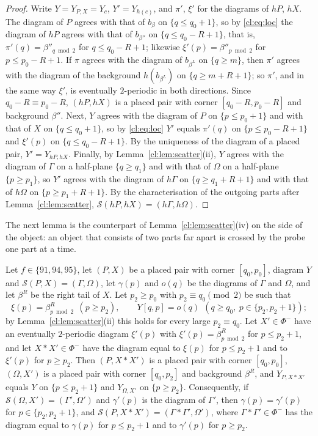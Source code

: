 \begin{proof}
Write $Y=Y_{P,X}=Y_c$, $Y'=Y_{h(c)}$, and $\pi'$, $\xi'$ for the diagrams of $hP$, $hX$. The diagram of $P$ agrees with that of $b_\beta$ on $\{q\le q_0+1\}$, so by \eqref{cl:eq:loc} the diagram of $hP$ agrees with that of $b_{\beta''}$ on $\{q\le q_0-R+1\}$, that is, $\pi'(q)=\beta''_{q\bmod2}$ for $q\le q_0-R+1$; likewise $\xi'(p)=\beta''_{p\bmod2}$ for $p\le p_0-R+1$. If $\pi$ agrees with the diagram of $b_{\beta^L}$ on $\{q\ge m\}$, then $\pi'$ agrees with the diagram of the background $h(b_{\beta^L})$ on $\{q\ge m+R+1\}$; so $\pi'$, and in the same way $\xi'$, is eventually $2$-periodic in both directions. Since $q_0-R\equiv p_0-R$, $(hP,hX)$ is a placed pair with corner $[q_0-R,p_0-R]$ and background $\beta''$. Next, $Y$ agrees with the diagram of $P$ on $\{p\le p_0+1\}$ and with that of $X$ on $\{q\le q_0+1\}$, so by \eqref{cl:eq:loc} $Y'$ equals $\pi'(q)$ on $\{p\le p_0-R+1\}$ and $\xi'(p)$ on $\{q\le q_0-R+1\}$. By the uniqueness of the diagram of a placed pair, $Y'=Y_{hP,hX}$. Finally, by Lemma~\ref{cl:lem:scatter}(ii), $Y$ agrees with the diagram of $\Gamma$ on a half-plane $\{q\ge q_1\}$ and with that of $\Omega$ on a half-plane $\{p\ge p_1\}$, so $Y'$ agrees with the diagram of $h\Gamma$ on $\{q\ge q_1+R+1\}$ and with that of $h\Omega$ on $\{p\ge p_1+R+1\}$. By the characterisation of the outgoing parts after Lemma~\ref{cl:lem:scatter}, $\mathcal S(hP,hX)=(h\Gamma,h\Omega)$.
\end{proof}

The next lemma is the counterpart of Lemma~\ref{cl:lem:scatter}(iv) on the side of the object: an object that consists of two parts far apart is crossed by the probe one part at a time.

\begin{lemma}\label{cl:lem:glue}
Let $f\in\{91,94,95\}$, let $(P,X)$ be a placed pair with corner $[q_0,p_0]$, diagram $Y$ and $\mathcal S(P,X)=(\Gamma,\Omega)$, let $\gamma(p)$ and $o(q)$ be the diagrams of $\Gamma$ and $\Omega$, and let $\beta^R$ be the right tail of $X$. Let $p_2\ge p_0$ with $p_2\equiv q_0\pmod2$ be such that
\[
\xi(p)=\beta^R_{p\bmod2}\ \ (p\ge p_2),\qquad Y[q,p]=o(q)\ \ (q\ge q_0,\ p\in\{p_2,p_2+1\});
\]
by Lemma~\ref{cl:lem:scatter}(ii) this holds for every large $p_2\equiv q_0$. Let $X'\in\Phi^-$ have an eventually $2$-periodic diagram $\xi'(p)$ with $\xi'(p)=\beta^R_{p\bmod2}$ for $p\le p_2+1$, and let $X*X'\in\Phi^-$ have the diagram equal to $\xi(p)$ for $p\le p_2+1$ and to $\xi'(p)$ for $p\ge p_2$. Then $(P,X*X')$ is a placed pair with corner $[q_0,p_0]$, $(\Omega,X')$ is a placed pair with corner $[q_0,p_2]$ and background $\beta^R$, and $Y_{P,X*X'}$ equals $Y$ on $\{p\le p_2+1\}$ and $Y_{\Omega,X'}$ on $\{p\ge p_2\}$. Consequently, if $\mathcal S(\Omega,X')=(\Gamma',\Omega')$ and $\gamma'(p)$ is the diagram of $\Gamma'$, then $\gamma(p)=\gamma'(p)$ for $p\in\{p_2,p_2+1\}$, and $\mathcal S(P,X*X')=(\Gamma*\Gamma',\Omega')$, where $\Gamma*\Gamma'\in\Phi^-$ has the diagram equal to $\gamma(p)$ for $p\le p_2+1$ and to $\gamma'(p)$ for $p\ge p_2$.
\end{lemma}

